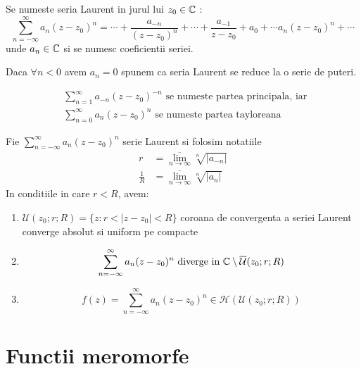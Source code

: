 \begin{definition}
    Se numeste seria Laurent in jurul lui $z_0 \in \mathbb{C}$ :
    \begin{equation}
        \sum_{n=-\infty}^{\infty} a_n(z-z_0)^n =
            \cdots + \frac{a_{-n}}{(z-z_0)^n} + \cdots + \frac{a_{-1}}{z-z_0} + a_0 + \cdots a_n(z-z_0)^n + \cdots
    \end{equation}
    unde $a_n \in \mathbb{C}$ si se numesc coeficientii seriei.

    Daca $\forall n < 0$ avem $a_n = 0$ spunem ca seria Laurent se reduce la o serie de puteri.

    \begin{align*}
        &\sum_{n=1}^{\infty} a_{-n}(z-z_0)^{-n} \text { se numeste partea principala, iar } \\
        &\sum_{n=0}^{\infty} a_n(z-z_0)^n \text { se numeste partea tayloreana}
    \end{align*}
\end{definition}

\begin{theorem}
    Fie $\displaystyle \sum_{n=-\infty}^{\infty} a_n(z-z_0)^n$ serie Laurent si folosim notatiile
    \begin{align*}
        r &= \overline{\lim_{n \to \infty}} \sqrt[n]{|a_{-n}|} \\
        \frac{1}{R} &=\overline{\lim_{n \to \infty}} \sqrt[n]{|a_n|}
    \end{align*}
    In conditiile in care $r<R$, avem:
    \begin{enumerate}
        \item $\mathcal{U}(z_0;r;R) = \{z \colon r < |z-z_0| < R\}$
            coroana de convergenta a seriei Laurent converge absolut si uniform pe compacte
        \item
            \[
                \sum_{n=-\infty}^{\infty} a_n(z-z_0)^n \text{ diverge in }
                    \mathbb{C} \setminus \overline{\mathcal{U}}(z_0;r;R)
            \]
        \item
            \[
                f(z) = \sum_{n=-\infty}^{\infty} a_n(z-z_0)^n \in \mathcal{H}(\mathcal{U}(z_0;r;R))
            \]
    \end{enumerate}
\end{theorem}

\section{Functii meromorfe}

